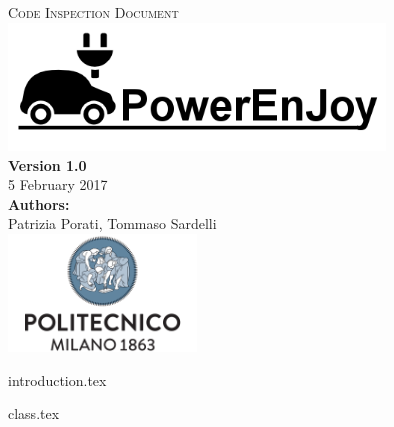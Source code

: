 \documentclass[a4paper,11pt]{article}
\begin{document}


\begin{titlepage}
\begin{center}
\textsc{\LARGE Code Inspection Document}\\[1.5cm] %

\includegraphics[width=10cm]{PowerEnJoy.png}\\
\vfill
\vfill
\textbf{Version 1.0}\\
5 February 2017\\[0.5cm]
\textbf{Authors:}\\
Patrizia Porati, Tommaso Sardelli\\[2.0cm] 


\vfill
\vfill
\includegraphics[width=50mm]{polimi.png}\\
\end{center}
\end{titlepage}

\tableofcontents
\pagebreak


{introduction.tex}




{class.tex}


\end{document}
